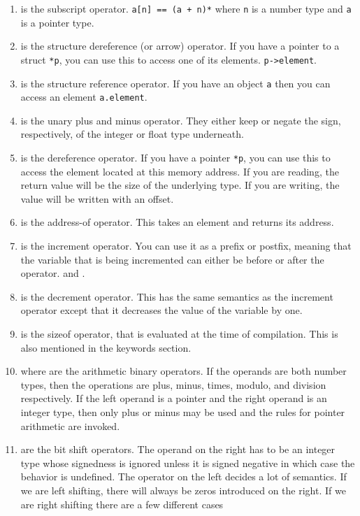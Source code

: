 \begin{enumerate}
	\item \keyword{[]} is the subscript operator. \texttt{a[n] == (a + n)*} where \texttt{n} is a number type and \texttt{a} is a pointer type.
	\item \keyword{->} is the structure dereference (or arrow) operator. If you have a pointer to a struct \texttt{*p}, you can use this to access one of its elements. \texttt{p->element}.
	\item {} is the structure reference operator. If you have an object \texttt{a} then you can access an element \texttt{a.element}.
	\item {} is the unary plus and minus operator. They either keep or negate the sign, respectively, of the integer or float type underneath.
	\item {} is the dereference operator. If you have a pointer \texttt{*p}, you can use this to access the element located at this memory address. If you are reading, the return value will be the size of the underlying type. If you are writing, the value will be written with an offset.
	\item {} is the address-of operator. This takes an element and returns its address.
	\item \keyword{++} is the increment operator. You can use it as a prefix or postfix, meaning that the variable that is being incremented can either be before or after the operator.  and .
	\item \keyword{--} is the decrement operator. This has the same semantics as the increment operator except that it decreases the value of the variable by one.
	\item {} is the sizeof operator, that is evaluated at the time of compilation. This is also mentioned in the keywords section.
	\item {} where  are the arithmetic binary operators. If the operands are both number types, then the operations are plus, minus, times, modulo, and division respectively. If the left operand is a pointer and the right operand is an integer type, then only plus or minus may be used and the rules for pointer arithmetic are invoked.
	\item \keyword{>>/<<} are the bit shift operators. The operand on the right has to be an integer type whose signedness is ignored unless it is signed negative in which case the behavior is undefined. The operator on the left decides a lot of semantics. If we are left shifting, there will always be zeros introduced on the right. If we are right shifting there are a few different cases

\end{enumerate}
